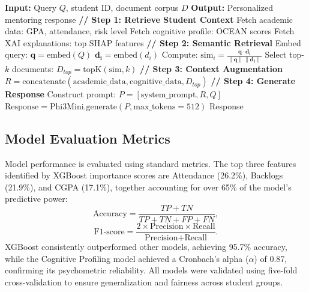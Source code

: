 \documentclass[conference]{IEEEtran}
\begin{document}
\begin{table}[H]
\centering
\begin{minipage}{0.48\textwidth}
\begin{algorithmic}[1]
\STATE \textbf{Input:} Query $Q$, student ID, document corpus $D$
\STATE \textbf{Output:} Personalized mentoring response
\STATE
\STATE \textbf{// Step 1: Retrieve Student Context}
\STATE Fetch academic data: GPA, attendance, risk level
\STATE Fetch cognitive profile: OCEAN scores
\STATE Fetch XAI explanations: top SHAP features
\STATE
\STATE \textbf{// Step 2: Semantic Retrieval}
\STATE Embed query: $\mathbf{q} = \text{embed}(Q)$
    \STATE $\mathbf{d_i} = \text{embed}(d_i)$
    \STATE Compute: $\text{sim}_i = \frac{\mathbf{q} \cdot \mathbf{d_i}}{\|\mathbf{q}\| \|\mathbf{d_i}\|}$
\ENDFOR
\STATE Select top-$k$ documents: $D_{top} = \text{topK}(\text{sim}, k)$
\STATE
\STATE \textbf{// Step 3: Context Augmentation}
\STATE $R = \text{concatenate}(\text{academic\_data}, \text{cognitive\_data}, D_{top})$
\STATE
\STATE \textbf{// Step 4: Generate Response}
\STATE Construct prompt: $P = [\text{system\_prompt}, R, Q]$
\STATE $\text{Response} = \text{Phi3Mini.generate}(P, \text{max\_tokens}=512)$
\STATE
\RETURN Response
\end{algorithmic}
\label{alg:rag}
\end{minipage}
\end{table}

\subsection{Model Evaluation Metrics}
Model performance is evaluated using standard metrics. The top three features identified by XGBoost importance scores are Attendance (26.2\%), Backlogs (21.9\%), and CGPA (17.1\%), together accounting for over 65\% of the model's predictive power:
\begin{equation}
    \text{Accuracy} = \frac{TP + TN}{TP + TN + FP + FN},
\end{equation}
\begin{equation}
    \text{F1-score} = \frac{2 \times \text{Precision} \times \text{Recall}}{\text{Precision} + \text{Recall}}.
\end{equation}
XGBoost consistently outperformed other models, achieving 95.7\% accuracy, while the Cognitive Profiling model achieved a Cronbach's alpha ($\alpha$) of 0.87, confirming its psychometric reliability. All models were validated using five-fold cross-validation to ensure generalization and fairness across student groups.
\end{document}
